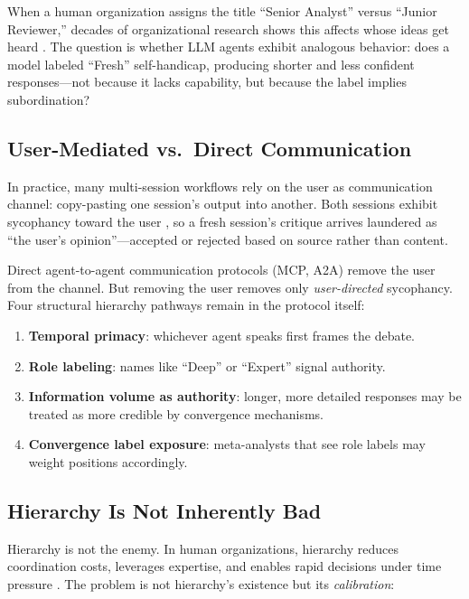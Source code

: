 \documentclass[11pt]{article}
\theoremstyle{definition}
\begin{document}
When a human organization assigns the title ``Senior Analyst'' versus ``Junior Reviewer,'' decades of organizational research shows this affects whose ideas get heard \citep{edmondson1999psychological}. The question is whether LLM agents exhibit analogous behavior: does a model labeled ``Fresh'' self-handicap, producing shorter and less confident responses---not because it lacks capability, but because the label implies subordination?

\subsection{User-Mediated vs.\ Direct Communication}

In practice, many multi-session workflows rely on the user as communication channel: copy-pasting one session's output into another. Both sessions exhibit sycophancy toward the user \citep{sharma2024sycophancy}, so a fresh session's critique arrives laundered as ``the user's opinion''---accepted or rejected based on source rather than content.

Direct agent-to-agent communication protocols (MCP, A2A) remove the user from the channel. But removing the user removes only \emph{user-directed} sycophancy. Four structural hierarchy pathways remain in the protocol itself:

\begin{enumerate}[nosep]
    \item \textbf{Temporal primacy}: whichever agent speaks first frames the debate.
    \item \textbf{Role labeling}: names like ``Deep'' or ``Expert'' signal authority.
    \item \textbf{Information volume as authority}: longer, more detailed responses may be treated as more credible by convergence mechanisms.
    \item \textbf{Convergence label exposure}: meta-analysts that see role labels may weight positions accordingly.
\end{enumerate}

\subsection{Hierarchy Is Not Inherently Bad}

Hierarchy is not the enemy. In human organizations, hierarchy reduces coordination costs, leverages expertise, and enables rapid decisions under time pressure \citep{klein1999sources, weber1922economy}. The problem is not hierarchy's existence but its \emph{calibration}:
\end{document}
